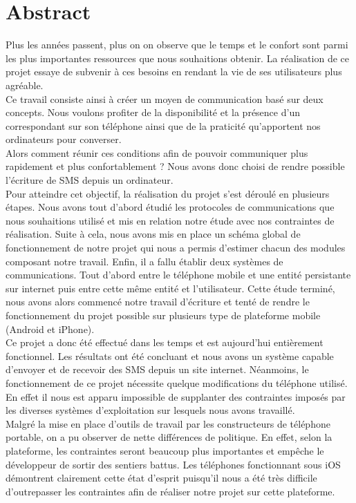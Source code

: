 \newpage



\chapter*{Abstract}

\thispagestyle{empty}



Plus les années passent, plus on on observe que le temps et le confort sont parmi
les plus importantes ressources que nous souhaitions obtenir. La réalisation de ce
projet essaye de subvenir à ces besoins en rendant la vie de ses utilisateurs plus agréable.
\\
Ce travail consiste ainsi à créer un moyen de communication basé sur deux concepts.
Nous voulons profiter de la disponibilité et la présence d'un correspondant sur son 
téléphone ainsi que de la praticité qu'apportent nos ordinateurs pour converser.
\\
Alors comment réunir ces conditions afin de pouvoir communiquer plus rapidement et plus confortablement ?
Nous avons donc choisi de rendre possible l'écriture de SMS depuis un ordinateur. 
\\
Pour atteindre cet objectif, la réalisation du projet s'est déroulé en plusieurs étapes.
Nous avons tout d'abord étudié les protocoles de communications que nous souhaitions utilisé
et mis en relation notre étude avec nos contraintes de réalisation. Suite à cela, nous avons
mis en place un schéma global de fonctionnement de notre projet qui nous a permis d'estimer
chacun des modules composant notre travail. Enfin, il a fallu établir deux systèmes de communications.
Tout d'abord entre le téléphone mobile et une entité persistante sur internet puis entre
cette même entité et l'utilisateur. Cette étude terminé, nous avons alors commencé notre
travail d'écriture et tenté de rendre le fonctionnement du projet possible sur plusieurs
type de plateforme mobile (Android et iPhone).
\\
Ce projet a donc été effectué dans les temps et est aujourd'hui entièrement fonctionnel.
Les résultats ont été concluant et nous avons un système capable d'envoyer et de recevoir
des SMS depuis un site internet. Néanmoins, le fonctionnement de ce projet nécessite quelque 
modifications du téléphone utilisé. En effet il nous est apparu impossible de supplanter
des contraintes imposés par les diverses systèmes d'exploitation sur lesquels nous avons travaillé.
\\
Malgré la mise en place d'outils de travail par les constructeurs de téléphone portable,
on a pu observer de nette différences de politique. En effet, selon la plateforme, les contraintes
seront beaucoup plus importantes et empêche le développeur de sortir des sentiers battus. 
Les téléphones fonctionnant sous iOS démontrent clairement cette état d'esprit puisqu'il 
nous a été très difficile  d'outrepasser les contraintes afin de réaliser notre projet sur cette plateforme.

